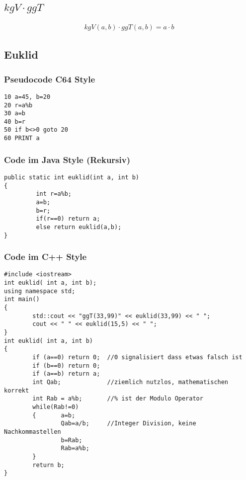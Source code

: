 \documentclass[a4paper]{scrartcl}
\newcommand\bigexists{\mbox{\huge $\exists$}}
\begin{document}
\subsection{$kgV \cdot ggT$}
\begin{align}
kgV(a,b) \cdot ggT(a,b) = a \cdot b
\end{align}

\subsection{Euklid}


\newpage
\subsubsection{Pseudocode C64 Style}
\begin{verbatim} 
10 a=45, b=20
20 r=a%b
30 a=b
40 b=r
50 if b<>0 goto 20
60 PRINT a
\end{verbatim}

\subsubsection{Code im Java Style (Rekursiv)}
\begin{verbatim} 
public static int euklid(int a, int b)
{
         int r=a%b;
         a=b;
         b=r;
         if(r==0) return a;
         else return euklid(a,b);
}
\end{verbatim}

\subsubsection{Code im C++ Style}
\begin{verbatim} 
#include <iostream>
int euklid( int a, int b);
using namespace std;
int main()
{
        std::cout << "ggT(33,99)" << euklid(33,99) << " ";
        cout << " " << euklid(15,5) << " ";
}
int euklid( int a, int b)
{
        if (a==0) return 0;  //0 signalisiert dass etwas falsch ist
        if (b==0) return 0;
        if (a==b) return a;
        int Qab;             //ziemlich nutzlos, mathematischen korrekt
        int Rab = a%b;       //% ist der Modulo Operator
        while(Rab!=0)
        {       a=b;
                Qab=a/b;     //Integer Division, keine Nachkommastellen
                b=Rab;
                Rab=a%b;
        }
        return b;
}
\end{verbatim}
\end{document}
